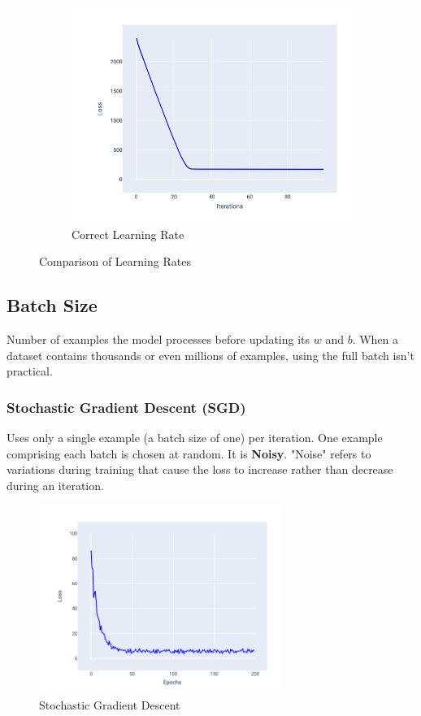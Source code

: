 \documentclass[a4paper,12pt]{article}
\begin{document}
\begin{figure}[H]
\begin{subfigure}[c]{0.45\textwidth}
        \centering
        \includegraphics[width=\textwidth]{../Images/Linear-Regression/correct-lr.png}
        \caption{Correct Learning Rate}
        \label{fig:correct-lr}
    \end{subfigure}
    \caption{Comparison of Learning Rates}
    \label{fig:lr-comparison}
\end{figure}

\subsection{Batch Size}
Number of examples the model processes before updating its $w$ and $b$. When a dataset contains thousands 
or even millions of examples, using the full batch isn't practical.
\subsubsection{Stochastic Gradient Descent (SGD)} 
Uses only a single example (a batch size of one) per iteration. One example comprising each batch is chosen at random. It is \textbf{Noisy}. "Noise" refers to variations during training that cause the loss to increase rather than decrease during an iteration. 
\begin{figure}[H]
    \centering
    \includegraphics[width=0.7\textwidth]{../Images/Linear-Regression/noisy-gradient.png}
    \caption{Stochastic Gradient Descent}
    \label{fig:noisy-gradient}
\end{figure}
\end{document}
